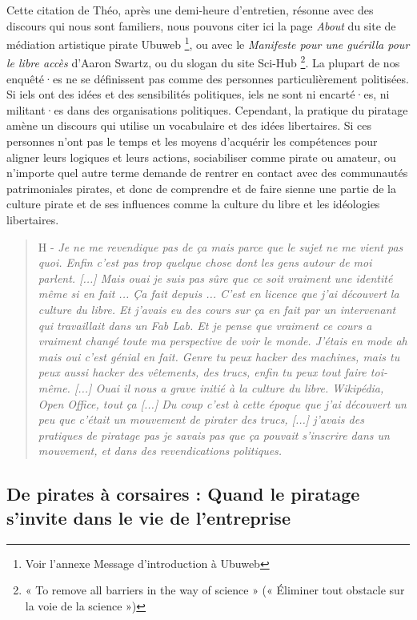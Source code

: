 Cette citation de Théo, après une demi-heure d'entretien, résonne avec des discours qui nous sont familiers, nous pouvons citer ici la page \textit{About} du site de médiation artistique pirate Ubuweb \footnote{Voir l'annexe Message d'introduction à Ubuweb}, ou avec le \textit{Manifeste pour une guérilla pour le libre accès} d'Aaron Swartz, ou du slogan du site Sci-Hub \footnote{« To remove all barriers in the way of science » (« Éliminer tout obstacle sur la voie de la science »)}. La plupart de nos enquêté·es ne se définissent pas comme des personnes particulièrement politisées. Si iels ont des idées et des sensibilités politiques, iels ne sont ni encarté·es, ni militant·es dans des organisations politiques. Cependant, la pratique du piratage amène un discours qui utilise un vocabulaire et des idées libertaires. Si ces personnes n'ont pas le temps et les moyens d'acquérir les compétences pour aligner leurs logiques et leurs actions, sociabiliser comme \og pirate \fg ou amateur, ou n'importe quel autre terme demande de rentrer en contact avec des communautés patrimoniales pirates, et donc de comprendre et de faire sienne une partie de la culture pirate et de ses influences comme la culture du libre et les idéologies libertaires. 

\begin{quote}
    H - \textit{Je ne me revendique pas de ça mais parce que le sujet ne me vient pas quoi. Enfin c'est pas trop quelque chose dont les gens autour de moi parlent. [...] Mais ouai je suis pas sûre que ce soit vraiment une identité même si en fait ... Ça fait depuis ... C'est en licence que j'ai découvert la culture du libre. Et j'avais eu des cours sur ça en fait par un intervenant qui travaillait dans un Fab Lab. Et je pense que vraiment ce cours a vraiment changé toute ma perspective de voir le monde. J'étais en mode ah mais oui c'est génial en fait. Genre tu peux hacker des machines, mais tu peux aussi hacker des vêtements, des trucs, enfin tu peux tout faire toi-même. [...] Ouai il nous a grave initié à la culture du libre. Wikipédia, Open Office, tout ça [...] Du coup c'est à cette époque que j'ai découvert un peu que c'était un mouvement de pirater des trucs, [...] j'avais des pratiques de piratage pas je savais pas que ça pouvait s'inscrire dans un mouvement, et dans des revendications politiques.}
\end{quote} 


\subsection*{De pirates à corsaires :  Quand le piratage s'invite dans le vie de l'entreprise}

